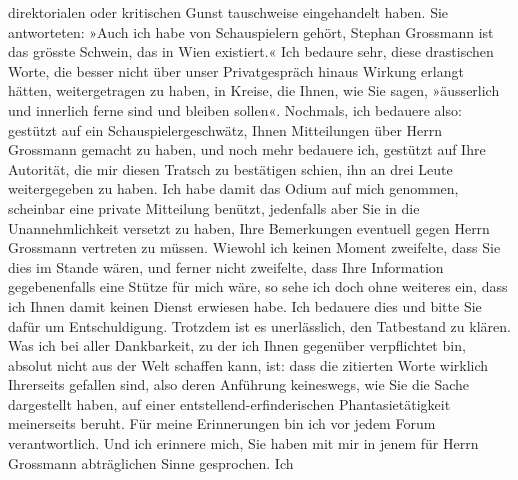 \begin{ledgroupsized}[t]{13cm}
                    direktorialen oder kritischen Gunst tauschweise eingehandelt haben. Sie
                    antworteten: »Auch ich habe von Schauspielern gehört, Stephan Grossmann ist das grösste Schwein, das in Wien existiert.« Ich bedaure sehr, diese drastischen
                    Worte, die besser nicht über unser Privatgespräch hinaus Wirkung erlangt hätten,
                    weitergetragen zu haben, in Kreise, die Ihnen, wie Sie sagen, »äusserlich und
                    innerlich ferne sind und bleiben sollen«.\pend
           \pstart
           Nochmals, ich bedauere also: gestützt auf ein Schauspielergeschwätz, Ihnen
                    Mitteilungen über Herrn Grossmann gemacht zu
                    haben, und noch mehr bedauere ich, gestützt auf Ihre Autorität, die mir diesen
                    Tratsch zu bestätigen schien, ihn an drei Leute weitergegeben zu haben. Ich habe
                    damit das Odium auf mich genommen, scheinbar eine private Mitteilung benützt,
                    jedenfalls aber Sie in die Unannehmlichkeit versetzt zu haben, Ihre Bemerkungen
                    eventuell gegen Herrn Grossmann vertreten zu
                    müssen. Wiewohl ich keinen Moment zweifelte, dass Sie dies im Stande wären, und
                    ferner nicht zweifelte, dass Ihre Information gegebenenfalls eine Stütze für
                    mich wäre, so sehe ich doch ohne weiteres ein, dass ich Ihnen damit keinen
                    Dienst erwiesen habe. Ich bedauere dies und bitte Sie dafür um Entschuldigung.
                    Trotzdem ist es un{\pb}erlässlich, den Tatbestand zu
                    klären. Was ich bei aller Dankbarkeit, zu der ich Ihnen gegenüber verpflichtet
                    bin, absolut nicht aus der Welt schaffen kann, ist: dass die zitierten Worte
                    wirklich Ihrerseits gefallen sind, also deren Anführung keineswegs, wie Sie die
                    Sache dargestellt haben, auf einer entstellend-erfinderischen Phantasietätigkeit
                    meinerseits beruht. Für meine Erinnerungen bin ich vor jedem Forum
                    verantwortlich. Und ich erinnere mich, Sie haben mit mir in jenem für Herrn Grossmann abträglichen Sinne gesprochen. Ich

\end{ledgroupsized}
